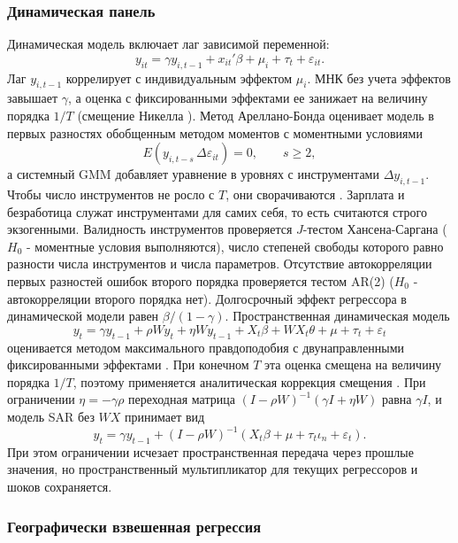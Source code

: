 \documentclass[12pt, a4paper]{article}
\begin{document}
\subsubsection*{Динамическая панель}

Динамическая модель включает лаг зависимой переменной:
\[
y_{it} = \gamma y_{i,t-1} + x_{it}' \beta + \mu_i + \tau_t + \varepsilon_{it}.
\]
\indent Лаг $y_{i,t-1}$ коррелирует с индивидуальным эффектом $\mu_i$. МНК без учета эффектов
завышает $\gamma$, а оценка с фиксированными эффектами ее занижает на величину порядка $1/T$
(смещение Никелла \cite{nickell1981}). Метод Ареллано-Бонда \cite{arellano1991} оценивает модель в
первых разностях обобщенным методом моментов с моментными условиями
\[
E\left( y_{i,t-s} \, \Delta \varepsilon_{it} \right) = 0, \qquad s \ge 2,
\]
а системный GMM \cite{blundell1998} добавляет уравнение в уровнях с инструментами
$\Delta y_{i,t-1}$. Чтобы число инструментов не росло с $T$, они сворачиваются
\cite{roodman2009}. Зарплата и безработица служат инструментами для самих себя, то есть считаются
строго экзогенными. Валидность инструментов проверяется $J$-тестом Хансена-Саргана ($H_0$ -
моментные условия выполняются), число степеней свободы которого равно разности числа инструментов
и числа параметров. Отсутствие автокорреляции первых разностей ошибок второго порядка
проверяется тестом AR(2) ($H_0$ - автокорреляции второго порядка нет). Долгосрочный эффект
регрессора в динамической модели равен $\beta / (1 - \gamma)$. Пространственная динамическая модель
\[
y_{t} = \gamma y_{t-1} + \rho W y_{t} + \eta W y_{t-1} + X_t \beta + W X_t \theta + \mu + \tau_t + \varepsilon_t
\]
оценивается методом максимального правдоподобия с двунаправленными фиксированными эффектами
\cite{yu2008, lee2010}. При конечном $T$ эта оценка смещена на величину порядка $1/T$, поэтому
применяется аналитическая коррекция смещения \cite{lee2010dynamic}. При ограничении
$\eta = -\gamma \rho$ переходная матрица $(I - \rho W)^{-1} (\gamma I + \eta W)$ равна $\gamma I$,
и модель SAR без $WX$ принимает вид
\[
y_t = \gamma y_{t-1} + (I - \rho W)^{-1} \left( X_t \beta + \mu + \tau_t \iota_n + \varepsilon_t \right).
\]
\indent При этом ограничении исчезает пространственная передача через прошлые значения, но
пространственный мультипликатор для текущих регрессоров и шоков сохраняется.

\subsubsection*{Географически взвешенная регрессия}
\end{document}
